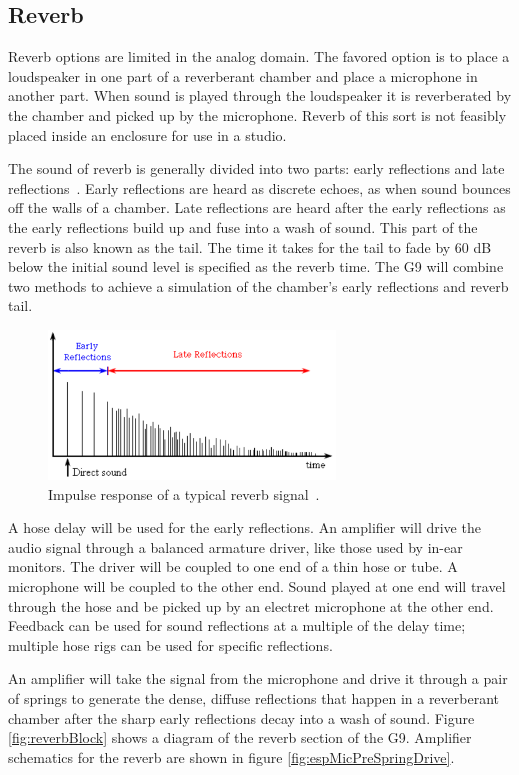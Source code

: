 \documentclass[journal]{IEEEtran}
\begin{document}
	
	\subsection{Reverb}
	Reverb options are limited in the analog domain. The favored option is to place a loudspeaker in one part of a reverberant chamber and place a microphone in another part. When sound is played through the loudspeaker it is reverberated by the chamber and picked up by the microphone. Reverb of this sort is not feasibly placed inside an enclosure for use in a studio. 
	
	The sound of reverb is generally divided into two parts: early reflections and late reflections~\cite{earlyReflections}. Early reflections are heard as discrete echoes, as when sound bounces off the walls of a chamber. Late reflections are heard after the early reflections as the early reflections build up and fuse into a wash of sound. This part of the reverb is also known as the tail. The time it takes for the tail to fade by 60 dB below the initial sound level is specified as the reverb time. The G9 will combine two methods to achieve a simulation of the chamber's early reflections and reverb tail.
	
	\begin{figure}
		\centering
		\includegraphics[width=3in]{earlyReflections}
		\caption{Impulse response of a typical reverb signal~\cite{vocalEarlyReflections}. }
		\label{fig:earlyReflections}
	\end{figure}
	
	A hose delay will be used for the early reflections. An amplifier will drive the audio signal through a balanced armature driver, like those used by in-ear monitors. The driver will be coupled to one end of a thin hose or tube. A microphone will be coupled to the other end. Sound played at one end will travel through the hose and be picked up by an electret microphone at the other end. Feedback can be used for sound reflections at a multiple of the delay time; multiple hose rigs can be used for specific reflections.
	
	An amplifier will take the signal from the microphone and drive it through a pair of springs to generate the dense, diffuse reflections that happen in a reverberant chamber after the sharp early reflections decay into a wash of sound. Figure \ref{fig:reverbBlock} shows a diagram of the reverb section of the G9. Amplifier schematics for the reverb are shown in figure \ref{fig:espMicPreSpringDrive}.
	
\end{document}
